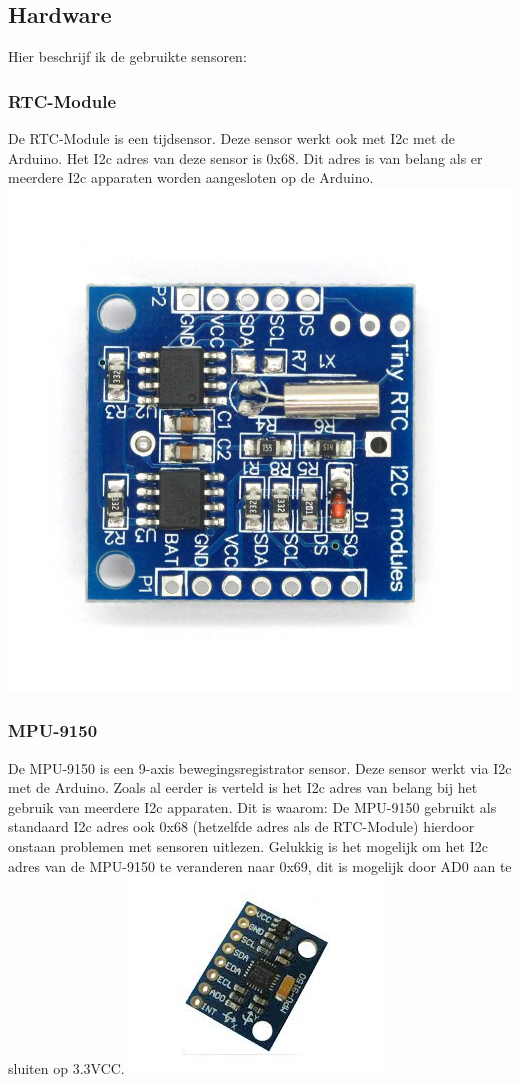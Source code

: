 \documentclass[a4paper,12pt]{article}
\begin{document}
\subsection{Hardware}
Hier beschrijf ik de gebruikte sensoren:
\subsubsection{RTC-Module}
De RTC-Module is een tijdsensor. Deze sensor werkt ook met I2c met de Arduino. 
Het I2c adres van deze sensor is 0x68. Dit adres is van belang als er meerdere I2c apparaten worden aangesloten op de Arduino.
\newline
\includegraphics[scale=0.2]{RTC}
\subsubsection{MPU-9150}
De MPU-9150 is een 9-axis bewegingsregistrator sensor. Deze sensor werkt via I2c met de Arduino.
Zoals al eerder is verteld is het I2c adres van belang bij het gebruik van meerdere I2c apparaten.
Dit is waarom: De MPU-9150 gebruikt als standaard I2c adres ook 0x68 (hetzelfde adres als de RTC-Module) hierdoor onstaan problemen met sensoren uitlezen.
Gelukkig is het mogelijk om het I2c adres van de MPU-9150 te veranderen naar 0x69, dit is mogelijk door AD0 aan te sluiten op 3.3VCC. 
\newline
\includegraphics[scale=0.8]{MPU-9150}
\end{document}
